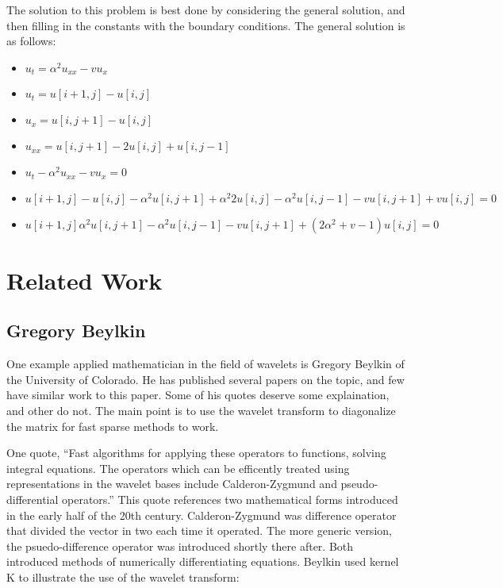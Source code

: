 The solution to this problem is best done by considering the general solution, and then filling in the constants with the boundary conditions.  The general solution is as follows:

\begin{itemize}
\item $u_t = \alpha ^2 u_{xx} - vu_x $
\item $u_t  =  u[i+1,j] - u [i,j]$
\item $u_x = u[i,j+1] - u[i,j] $
\item $u_{xx} = u[i,j+1] - 2u[i,j] + u[i,j-1] $
\item $u_t - \alpha ^2 u_{xx} - vu_x = 0$
\item $ u[i+1,j] - u [i,j] -  \alpha ^2 u[i,j+1] + \alpha ^2 2u[i,j] - \alpha ^2 u[i,j-1] - v u[i,j+1] + v u[i,j] =0$
\item $ u[i+1,j]   \alpha ^2 u[i,j+1]  - \alpha ^2 u[i,j-1] - v u[i,j+1] + (2 \alpha ^2 +v - 1)  u[i,j] =0$ 
\end{itemize}


\section {Related Work}

\subsection {Gregory Beylkin}
One example applied mathematician in the field of wavelets is Gregory Beylkin of the University of Colorado.  He has published several papers on the topic, and few have similar work to this paper.  Some of his quotes deserve some explaination, and other do not.  The main point is to use the wavelet transform to diagonalize the matrix for fast sparse methods to work.  

One quote, ``Fast algorithms for applying these operators to functions, solving integral equations.  The operators which can be efficently treated using representations in the wavelet bases include Calderon-Zygmund and pseudo-differential operators.''\cite{bvpbeylkin}  This quote references two mathematical forms introduced in the early half of the 20th century.  Calderon-Zygmund was difference operator that divided the vector in two each time it operated.  The more generic version, the psuedo-difference operator was introduced shortly there after.  Both introduced methods of numerically differentiating equations.  Beylkin used kernel K to illustrate the use of the wavelet transform: 

